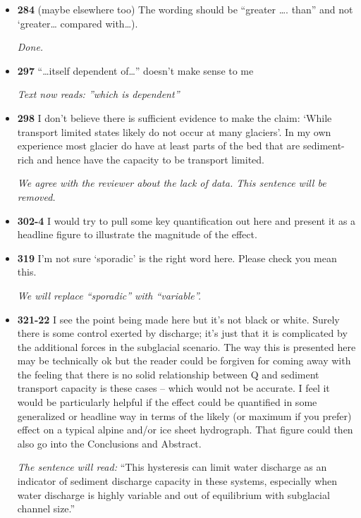 \documentclass[11pt]{article}
\begin{document}
\begin{itemize}
\item \textbf{284} (maybe
  elsewhere too)
  The wording should be “greater …. than” and not ‘greater… compared
  with…).

  \textit{Done.}

\item \textbf{297} “…itself dependent of…” doesn’t make sense to me

  \textit{Text now reads: ''which is dependent''}

\item \textbf{298} I don’t believe there is sufficient evidence to make the claim: ‘While
  transport limited states likely do not occur at many glaciers’. In my own
  experience most glacier do have at least parts of the bed that are sediment-
  rich and hence have the capacity to be transport limited.

  \textit{We agree with the reviewer about the lack of data. This sentence will be removed. }


  
\item \textbf{302-4} I would try to pull some key quantification out here and present it as a
  headline figure to illustrate the magnitude of the effect.

\item \textbf{319} I’m not sure ‘sporadic’ is the right word here. Please check you mean this.

  \textit{We will replace ``sporadic'' with ``variable''.}
  

  
\item \textbf{321-22} I see the point being made here but it’s not black or white. Surely there is
  some control exerted by discharge; it’s just that it is complicated by the
  additional forces in the subglacial scenario. The way this is presented here
  may be technically ok but the reader could be forgiven for coming away
  with the feeling that there is no solid relationship between Q and sediment
  transport capacity is these cases – which would not be accurate. I feel it
  would be particularly helpful if the effect could be quantified in some
  generalized or headline way in terms of the likely (or maximum if you
  prefer) effect on a typical alpine and/or ice sheet hydrograph. That figure
  could then also go into the Conclusions and Abstract.

  \textit{The sentence will read:} ``This hysteresis can limit water discharge as an indicator of sediment discharge capacity in these systems, especially when water discharge is highly variable and out of equilibrium with subglacial channel size.''


\end{itemize}
\end{document}

